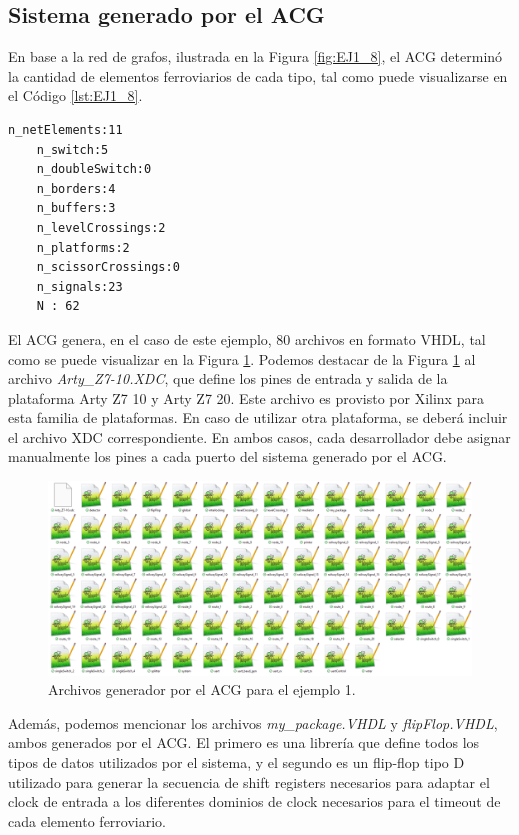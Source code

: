 \subsection{Sistema generado por el ACG}
	\label{sec:EJEMPLO1_ACG}
	
	En base a la red de grafos, ilustrada en la Figura \ref{fig:EJ1_8}, el ACG determinó la cantidad de elementos ferroviarios de cada tipo, tal como puede visualizarse en el Código \ref{lst:EJ1_8}.
	
	\begin{lstlisting}[language = {}, caption = Cantidad de elementos a implementar por el ACG, label = {lst:EJ1_8}]
	n_netElements:11
	n_switch:5
	n_doubleSwitch:0
	n_borders:4
	n_buffers:3
	n_levelCrossings:2
	n_platforms:2
	n_scissorCrossings:0
	n_signals:23
	N : 62
	\end{lstlisting}
	
	El ACG genera, en el caso de este ejemplo, 80 archivos en formato VHDL, tal como se puede visualizar en la Figura \ref{fig:EJ1_ACG_1}. Podemos destacar de la Figura \ref{fig:EJ1_ACG_1} al archivo \textit{Arty\_Z7-10.XDC}, que define los pines de entrada y salida de la plataforma Arty Z7 10 y Arty Z7 20. Este archivo es provisto por Xilinx para esta familia de plataformas. En caso de utilizar otra plataforma, se deberá incluir el archivo XDC correspondiente. En ambos casos, cada desarrollador debe asignar manualmente los pines a cada puerto del sistema generado por el ACG.
	
	\begin{figure}[H]
		\centering
		\includegraphics[origin = c, width=1\textwidth]{resultados-obtenidos/ejemplo1/images/ACG_files}
		\centering\caption{Archivos generador por el ACG para el ejemplo 1.}
		\label{fig:EJ1_ACG_1}
	\end{figure}
	
	Además, podemos mencionar los archivos \textit{my\_package.VHDL} y \textit{flipFlop.VHDL}, ambos generados por el ACG. El primero es una librería que define todos los tipos de datos utilizados por el sistema, y el segundo es un flip-flop tipo D utilizado para generar la secuencia de shift registers necesarios para adaptar el clock de entrada a los diferentes dominios de clock necesarios para el timeout de cada elemento ferroviario.
	
